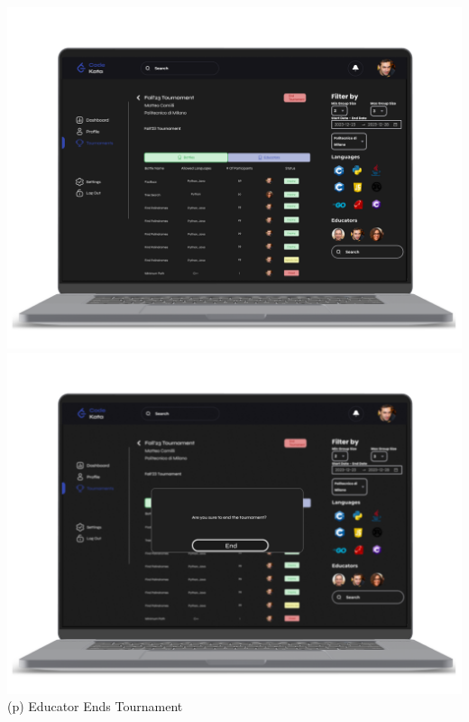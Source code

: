 \begin{center}
\includegraphics[scale=0.13]{Images/ui-ux/educator_end_tournament.png}
\includegraphics[scale=0.13]{Images/ui-ux/educator_end_tournament_1.png}
        (p) Educator Ends Tournament
\end{center}

\newpage
